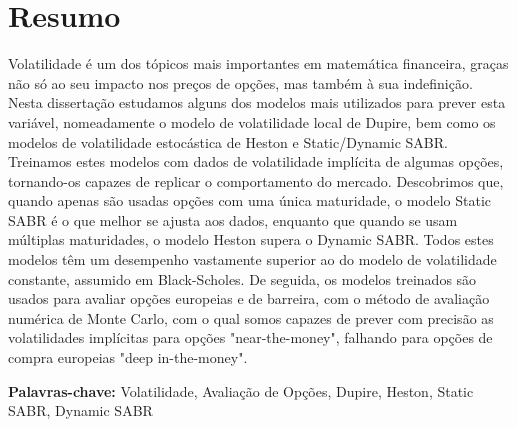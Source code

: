 
\section*{Resumo}


Volatilidade é um dos tópicos mais importantes em matemática financeira, graças não só ao seu impacto nos preços de opções, mas também à sua indefinição. Nesta dissertação estudamos alguns dos modelos mais utilizados para prever esta variável, nomeadamente o modelo de volatilidade local de Dupire, bem como os modelos de volatilidade estocástica de Heston e Static/Dynamic SABR.
Treinamos estes modelos com dados de volatilidade implícita de algumas opções, tornando-os capazes de replicar o comportamento do mercado. Descobrimos que, quando apenas são usadas opções com uma única maturidade, o modelo Static SABR é o que melhor se ajusta aos dados, enquanto que quando se usam múltiplas maturidades, o modelo Heston supera o Dynamic SABR. Todos estes modelos têm um desempenho vastamente superior ao do modelo de volatilidade constante, assumido em Black-Scholes.
De seguida, os modelos treinados são usados para avaliar opções europeias e de barreira, com o método de avaliação numérica de Monte Carlo, com o qual somos capazes de prever com precisão as volatilidades implícitas para opções "near-the-money", falhando para opções de compra europeias "deep in-the-money".

\vfill

\textbf{\Large Palavras-chave:} Volatilidade, Avaliação de Opções, Dupire, Heston, Static SABR, Dynamic SABR




